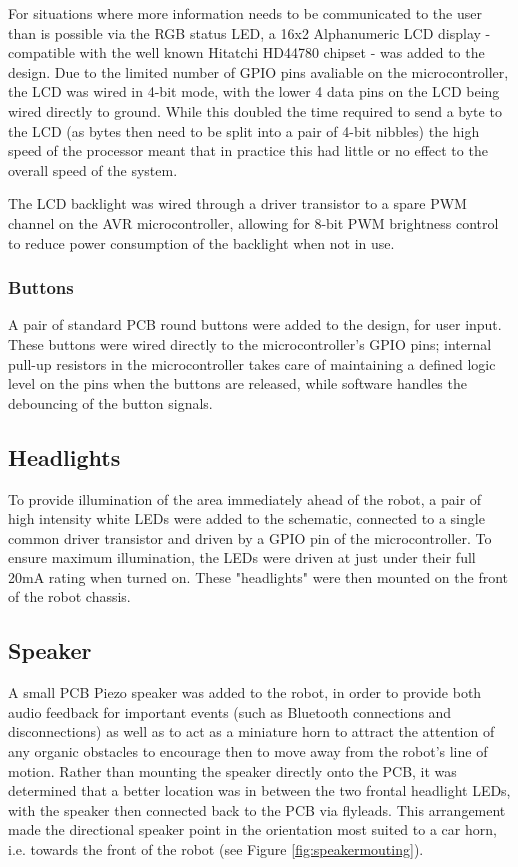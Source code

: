 For situations where more information needs to be communicated to the user than is possible via the RGB status LED, a 16x2 Alphanumeric LCD display - compatible with the well known Hitatchi HD44780 chipset - was added to the design. Due to the limited number of GPIO pins avaliable on the microcontroller, the LCD was wired in 4-bit mode, with the lower 4 data pins on the LCD being wired directly to ground. While this doubled the time required to send a byte to the LCD (as bytes then need to be split into a pair of 4-bit nibbles) the high speed of the processor meant that in practice this had little or no effect to the overall speed of the system.

The LCD backlight was wired through a driver transistor to a spare PWM channel on the AVR microcontroller, allowing for 8-bit PWM brightness control to reduce power consumption of the backlight when not in use.

\subsubsection{Buttons}

A pair of standard PCB round buttons were added to the design, for user input. These buttons were wired directly to the microcontroller's GPIO pins; internal pull-up resistors in the microcontroller takes care of maintaining a defined logic level on the pins when the buttons are released, while software handles the debouncing of the button signals.

\subsection{Headlights}

To provide illumination of the area immediately ahead of the robot, a pair of high intensity white LEDs were added to the schematic, connected to a single common driver transistor and driven by a GPIO pin of the microcontroller. To ensure maximum illumination, the LEDs were driven at just under their full 20mA rating when turned on. These "headlights" were then mounted on the front of the robot chassis.

\subsection{Speaker}

A small PCB Piezo speaker was added to the robot, in order to provide both audio feedback for important events (such as Bluetooth connections and disconnections) as well as to act as a miniature horn to attract the attention of any organic obstacles to encourage then to move away from the robot's line of motion. Rather than mounting the speaker directly onto the PCB, it was determined that a better location was in between the two frontal headlight LEDs, with the speaker then connected back to the PCB via flyleads. This arrangement made the directional speaker point in the orientation most suited to a car horn, i.e. towards the front of the robot (see Figure \ref{fig:speakermouting}).

